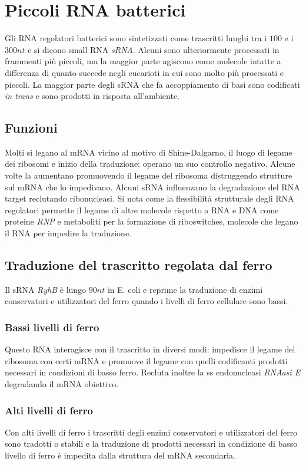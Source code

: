 \section{Piccoli RNA batterici}
Gli RNA regolatori batterici sono sintetizzati come trascritti lunghi tra i $100$ e i $300nt$ e si dicono small RNA \emph{sRNA}. Alcuni sono ulteriormente processati in frammenti pi\`u 
piccoli, ma la maggior parte agiscono come molecole intatte a differenza di quanto succede negli eucarioti in cui sono molto pi\`u processati e piccoli. La maggior parte degli sRNA
che fa accoppiamento di basi sono codificati \emph{in trans} e sono prodotti in risposta all'ambiente. 
\subsection{Funzioni}
Molti si legano al mRNA vicino al motivo di Shine-Dalgarno, il luogo di legame dei ribosomi e inizio della traduzione: operano un suo controllo negativo. Alcune volte la aumentano 
promuovendo il legame del ribosoma distruggendo strutture sul mRNA che lo impedivano. Alcuni sRNA influenzano la degradazione del RNA target reclutando ribonucleasi. Si nota come
la flessibilit\`a strutturale degli RNA regolatori permette il legame di altre molecole rispetto a RNA e DNA come proteine \emph{RNP} e metaboliti per la formazione di riboswitches, 
molecole che legano il RNA per impedire la traduzione. 
\subsection{Traduzione del trascritto regolata dal ferro}
Il sRNA \emph{RyhB} \`e lungo $90nt$ in E. coli e reprime la traduzione di enzimi conservatori e utilizzatori del ferro quando i livelli di ferro cellulare sono bassi. 
\subsubsection{Bassi livelli di ferro}
Questo RNA interagisce con il trascritto in diversi modi: impedisce il legame del ribosoma con certi mRNA e promuove il legame con quelli codificanti prodotti necessari in condizioni di 
basso ferro. Recluta inoltre la ss endonucleasi \emph{RNAasi E} degradando il mRNA obiettivo. 
\subsubsection{Alti livelli di ferro}
Con alti livelli di ferro i trascritti degli enzimi conservatori e utilizzatori del ferro sono tradotti o stabili e la traduzione di prodotti necessari in condizione di basso livello 
di ferro \`e impedita dalla struttura del mRNA secondaria. 
